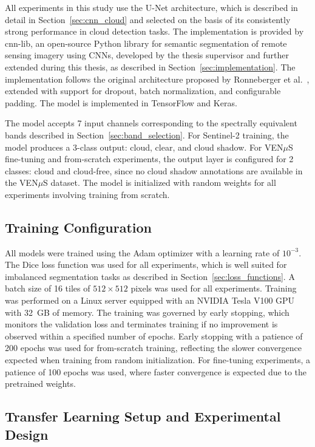 All experiments in this study use the U-Net architecture, which is described in detail in Section~\ref{sec:cnn_cloud} and selected on the basis of its consistently strong performance in cloud detection tasks. The implementation is provided by cnn-lib, an open-source Python library for semantic segmentation of remote sensing imagery using CNNs, developed by the thesis supervisor and further extended during this thesis, as described in Section~\ref{sec:implementation}. The implementation follows the original architecture proposed by Ronneberger et al.\ \cite{ronneberger2015}, extended with support for dropout, batch normalization, and configurable padding. The model is implemented in TensorFlow and Keras.

The model accepts 7 input channels corresponding to the spectrally equivalent bands described in Section~\ref{sec:band_selection}. For Sentinel-2 training, the model produces a 3-class output: cloud, clear, and cloud shadow. For VEN$\mu$S fine-tuning and from-scratch experiments, the output layer is configured for 2 classes: cloud and cloud-free, since no cloud shadow annotations are available in the VEN$\mu$S dataset. The model is initialized with random weights for all experiments involving training from scratch.

\subsection{Training Configuration}
\label{sec:training}

All models were trained using the Adam optimizer with a learning rate of $10^{-3}$. The Dice loss function was used for all experiments, which is well suited for imbalanced segmentation tasks as described in Section~\ref{sec:loss_functions}. A batch size of 16 tiles of $512 \times 512$ pixels was used for all experiments. Training was performed on a Linux server equipped with an NVIDIA Tesla V100 GPU with 32~GB of memory. The training was governed by early stopping, which monitors the validation loss and terminates training if no improvement is observed within a specified number of epochs. Early stopping with a patience of 200 epochs was used for from-scratch training, reflecting the slower convergence expected when training from random initialization. For fine-tuning experiments, a patience of 100 epochs was used, where faster convergence is expected due to the pretrained weights.

\subsection{Transfer Learning Setup and Experimental Design}
\label{sec:transfer}

